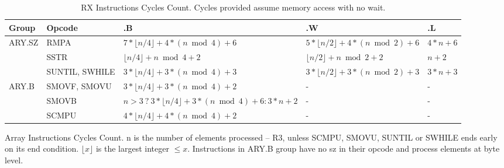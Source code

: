 \begin{table}
\vspace{0.5cm}

\begin{subtable}{\linewidth}
\begin{center}
\scriptsize
\setlength{\tabcolsep}{4pt}
\begin{tabular}{lllll}
\hline
Group     & Opcode            & .B                                                                    & .W                                                & .L              \\ \hline
ARY.SZ    & RMPA              & $7 * \lfloor n/4 \rfloor + 4 * (n \bmod 4) + 6$                       & $5 * \lfloor n/2 \rfloor + 4 * (n \bmod 2) + 6$   & $4 * n + 6$     \\
          & SSTR              & $\lfloor n/4 \rfloor + n \bmod 4 + 2$                                 & $\lfloor n/2 \rfloor + n \bmod 2 + 2$             & $n + 2$         \\
          & SUNTIL, SWHILE    & $3 * \lfloor n/4 \rfloor + 3 * (n \bmod 4) + 3$                       & $3 * \lfloor n/2 \rfloor + 3 * (n \bmod 2) + 3$   & $3 * n + 3$     \\
ARY.B     & SMOVF, SMOVU      & $3 * \lfloor n/4 \rfloor + 3 * (n \bmod 4) + 2$                       & -                                                 & -               \\
          & SMOVB             & $n > 3\ ?\ 3 * \lfloor n/4 \rfloor + 3 * (n \bmod 4) + 6 : 3 * n + 2$ & -                                                 & -               \\
          & SCMPU             & $4 * \lfloor n/4 \rfloor + 4 * (n \bmod 4) + 2$                       & -                                                 & -               \\ \hline
\end{tabular}
\end{center}
\captionsetup{font=scriptsize, labelfont=scriptsize}
\caption{Array Instructions Cycles Count. n is the number of elements processed -- R3, unless SCMPU, SMOVU, 
SUNTIL or SWHILE ends early on its end condition. $\lfloor x \rfloor$ is the largest integer $\le x$. 
Instructions in ARY.B group have no sz in their opcode and process elements at byte level.}
\end{subtable}
\captionsetup{font=scriptsize, labelfont=scriptsize}
\caption{RX Instructions Cycles Count. Cycles provided assume memory access with no wait.}
\end{table}

